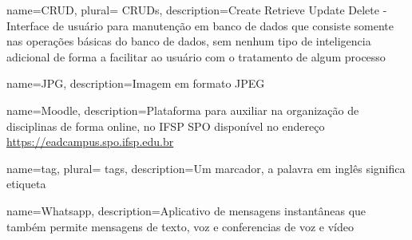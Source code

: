 



 



 {
    name=CRUD,
    plural= {CRUDs},
    description={Create Retrieve Update Delete - Interface de usuário para manutenção em
    banco de dados que consiste somente nas operações básicas do banco de dados, sem nenhum
    tipo de inteligencia adicional de forma a facilitar ao usuário com o tratamento de algum processo}
}

 {
    name=JPG,
    description={Imagem em formato JPEG}
}

 {
    name=Moodle,
    description={Plataforma para auxiliar na organização de disciplinas de forma online,
    no IFSP SPO disponível no endereço \url{https://eadcampus.spo.ifsp.edu.br}}
}

 {
    name=tag,
    plural= {tags},
    description={Um marcador, a palavra em inglês significa etiqueta}
}
                
 {
    name=Whatsapp,
    description={Aplicativo de mensagens instantâneas que também permite mensagens de texto,
    voz e conferencias de voz e vídeo}
}

